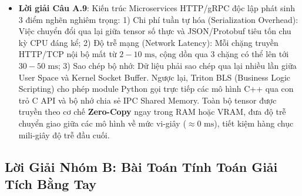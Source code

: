 \begin{itemize}
  \item \textbf{Lời giải Câu A.9}:
  Kiến trúc Microservices HTTP/gRPC độc lập phát sinh 3 điểm nghẽn nghiêm trọng:
  1) Chi phí tuần tự hóa (Serialization Overhead): Việc chuyển đổi qua lại giữa tensor số thực và JSON/Protobuf tiêu tốn chu kỳ CPU đáng kể;
  2) Độ trễ mạng (Network Latency): Mỗi chặng truyền HTTP/TCP nội bộ mất từ $2-10\text{ ms}$, cộng dồn qua 3 chặng có thể lên tới $30-50\text{ ms}$;
  3) Sao chép bộ nhớ: Dữ liệu phải sao chép qua lại nhiều lần giữa User Space và Kernel Socket Buffer.
  Ngược lại, Triton BLS (Business Logic Scripting) cho phép module Python gọi trực tiếp các mô hình C++ qua con trỏ C API và bộ nhớ chia sẻ IPC Shared Memory. Toàn bộ tensor được truyền theo cơ chế \textbf{Zero-Copy} ngay trong RAM hoặc VRAM, đưa độ trễ chuyển giao giữa các mô hình về mức vi-giây ($\approx 0\text{ ms}$), tiết kiệm hàng chục mili-giây độ trễ đầu cuối.
\end{itemize}

\subsection{Lời Giải Nhóm B: Bài Toán Tính Toán Giải Tích Bằng Tay}

